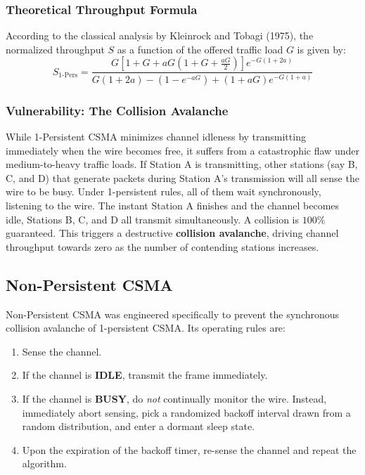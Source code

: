 \documentclass[12pt, a4paper]{article}
\begin{document}
\subsubsection{Theoretical Throughput Formula}
According to the classical analysis by Kleinrock and Tobagi (1975), the normalized throughput $S$ as a function of the offered traffic load $G$ is given by:
\begin{equation}
    S_{\text{1-Pers}} = \frac{G \left[ 1 + G + a G \left(1 + G + \frac{a G}{2}\right) \right] e^{-G(1 + 2a)}}{G(1 + 2a) - (1 - e^{-a G}) + (1 + a G) e^{-G(1 + a)}}
\end{equation}

\subsubsection{Vulnerability: The Collision Avalanche}
While 1-Persistent CSMA minimizes channel idleness by transmitting immediately when the wire becomes free, it suffers from a catastrophic flaw under medium-to-heavy traffic loads. If Station A is transmitting, other stations (say B, C, and D) that generate packets during Station A's transmission will all sense the wire to be busy. Under 1-persistent rules, all of them wait synchronously, listening to the wire. The instant Station A finishes and the channel becomes idle, Stations B, C, and D all transmit simultaneously. A collision is $100\%$ guaranteed. This triggers a destructive \textbf{collision avalanche}, driving channel throughput towards zero as the number of contending stations increases.

\subsection{Non-Persistent CSMA}
Non-Persistent CSMA was engineered specifically to prevent the synchronous collision avalanche of 1-persistent CSMA. Its operating rules are:
\begin{enumerate}
    \item Sense the channel.
    \item If the channel is \textbf{IDLE}, transmit the frame immediately.
    \item If the channel is \textbf{BUSY}, do \textit{not} continually monitor the wire. Instead, immediately abort sensing, pick a randomized backoff interval drawn from a random distribution, and enter a dormant sleep state.
    \item Upon the expiration of the backoff timer, re-sense the channel and repeat the algorithm.
\end{enumerate}
\end{document}
